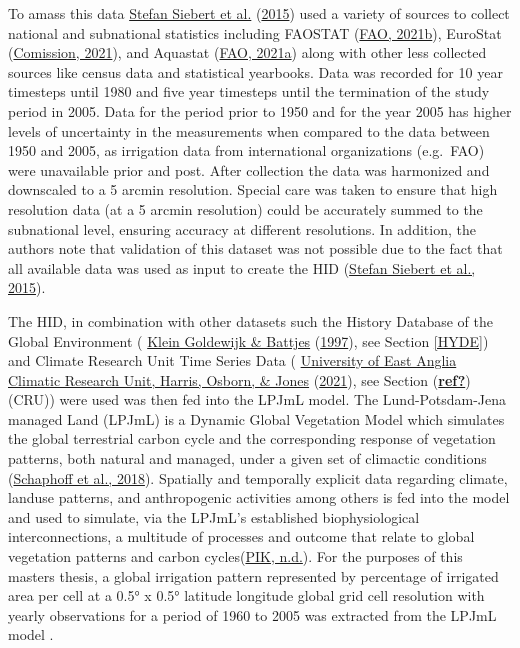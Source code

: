 \documentclass[12pt,twoside]{reedthesis}
\begin{document}
To amass this data \protect\hyperlink{ref-siebertGlobalDataSet2015}{Stefan Siebert et al.} (\protect\hyperlink{ref-siebertGlobalDataSet2015}{2015}) used a variety of sources to collect national and subnational statistics including FAOSTAT (\protect\hyperlink{ref-faoFAOSTAT2021}{FAO, 2021b}), EuroStat (\protect\hyperlink{ref-europeancomissionEurostatDatabase2021}{Comission, 2021}), and Aquastat (\protect\hyperlink{ref-faoAQUASTAT2021}{FAO, 2021a}) along with other less collected sources like census data and statistical yearbooks. Data was recorded for 10 year timesteps until 1980 and five year timesteps until the termination of the study period in 2005. Data for the period prior to 1950 and for the year 2005 has higher levels of uncertainty in the measurements when compared to the data between 1950 and 2005, as irrigation data from international organizations (e.g.~FAO) were unavailable prior and post. After collection the data was harmonized and downscaled to a 5 arcmin resolution. Special care was taken to ensure that high resolution data (at a 5 arcmin resolution) could be accurately summed to the subnational level, ensuring accuracy at different resolutions. In addition, the authors note that validation of this dataset was not possible due to the fact that all available data was used as input to create the HID (\protect\hyperlink{ref-siebertGlobalDataSet2015}{Stefan Siebert et al., 2015}).

The HID, in combination with other datasets such the History Database of the Global Environment ( \protect\hyperlink{ref-kleingoldewijkHundredYear18901997}{Klein Goldewijk \& Battjes} (\protect\hyperlink{ref-kleingoldewijkHundredYear18901997}{1997}), see Section \ref{HYDE}) and Climate Research Unit Time Series Data ( \protect\hyperlink{ref-universityofeastangliaclimaticresearchunitVersionCRUTS2021}{University of East Anglia Climatic Research Unit, Harris, Osborn, \& Jones} (\protect\hyperlink{ref-universityofeastangliaclimaticresearchunitVersionCRUTS2021}{2021}), see Section (\protect\hyperlink{ref-ref}{\textbf{ref?}})(CRU)) were used was then fed into the LPJmL model. The Lund-Potsdam-Jena managed Land (LPJmL) is a Dynamic Global Vegetation Model which simulates the global terrestrial carbon cycle and the corresponding response of vegetation patterns, both natural and managed, under a given set of climactic conditions (\protect\hyperlink{ref-schaphoffLPJmL4DynamicGlobal2018}{Schaphoff et al., 2018}). Spatially and temporally explicit data regarding climate, landuse patterns, and anthropogenic activities among others is fed into the model and used to simulate, via the LPJmL's established biophysiological interconnections, a multitude of processes and outcome that relate to global vegetation patterns and carbon cycles(\protect\hyperlink{ref-pikLPJmLLundPotsdamJenaManaged}{PIK, n.d.}). For the purposes of this masters thesis, a global irrigation pattern represented by percentage of irrigated area per cell at a 0.5° x 0.5° latitude longitude global grid cell resolution with yearly observations for a period of 1960 to 2005 was extracted from the LPJmL model .
\end{document}
